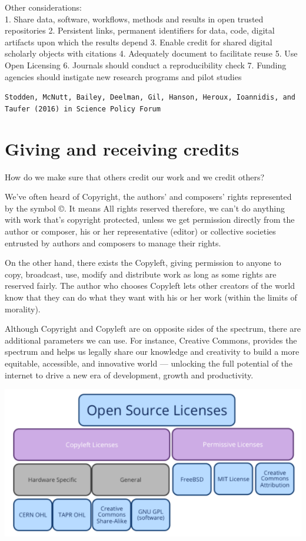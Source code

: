\documentclass[
  12pt,
]{book}
\begin{document}
Other considerations:\\
1. Share data, software, workflows, methods and results in open trusted repositories
2. Persistent links, permanent identifiers for data, code, digital artifacts upon which the results depend
3. Enable credit for shared digital scholarly objects with citations
4. Adequately document to facilitate reuse
5. Use Open Licensing
6. Journals should conduct a reproducibility check
7. Funding agencies should instigate new research programs and pilot studies

\texttt{Stodden,\ McNutt,\ Bailey,\ Deelman,\ Gil,\ Hanson,\ Heroux,\ Ioannidis,\ and\ Taufer\ (2016)\ in\ Science\ Policy\ Forum}

\hypertarget{giving-and-receiving-credits}{%
\chapter{Giving and receiving credits}\label{giving-and-receiving-credits}}

How do we make sure that others credit our work and we credit others?

We've often heard of Copyright, the authors' and composers' rights represented by the symbol ©.
It means All rights reserved therefore, we can't do anything with work that's copyright protected, unless we get permission directly from the author or composer, his or her representative (editor) or collective societies entrusted by authors and composers to manage their rights.

On the other hand, there exists the Copyleft, giving permission to anyone to copy, broadcast, use, modify and distribute work as long as some rights are reserved fairly. The author who chooses Copyleft lets other creators of the world know that they can do what they want with his or her work (within the limits of morality).

Although Copyright and Copyleft are on opposite sides of the spectrum, there are additional parameters we can use. For instance, Creative Commons, provides the spectrum and helps us legally share our knowledge and creativity to build a more equitable, accessible, and innovative world --- unlocking the full potential of the internet to drive a new era of development, growth and productivity.

\includegraphics{rr-presentation-figure/rightleft.png}
\end{document}
